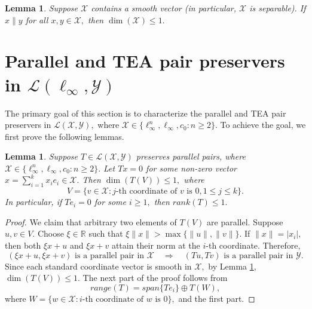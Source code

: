 \documentclass{amsart}
\newtheorem{lemma}[theorem]{Lemma}
\theoremstyle{definition}
\theoremstyle{remark}
\numberwithin{equation}{section}
\begin{document}
\begin{lemma}\label{lem-pdim}\cite[Lemma 2.3]{M} 
	Suppose $\mathcal{X}$ contains a smooth vector (in particular, $\mathcal{X}$ is separable). If $x\parallel y$ for all $x,y\in \mathcal{X},$ then $\dim(\mathcal{X})\leq 1.$	
\end{lemma}

\section{Parallel and TEA pair preservers in $\mathcal{L}(\ell_\infty,\mathcal{Y})$ }\label{sec-infinity}
The primary goal of this section is to characterize the parallel and TEA pair preservers in $\mathcal{L}(\mathcal{X},\mathcal{Y}),$  where  $\mathcal{X}\in \{\ell_\infty^n,\ell_\infty,c_0:n\geq 2\}.$  To achieve the goal, we first prove the following lemmas.


\begin{lemma}\label{lem-r1}
	Suppose $T\in \mathcal{L}(\mathcal{X},\mathcal{Y})$  preserves parallel pairs, where  $\mathcal{X}\in \{\ell_\infty^n,\ell_\infty,c_0:n\geq 2\}.$  Let $Tx=0$ for some non-zero vector $x=\sum_{i=1}^kx_ie_i\in \mathcal{X}.$ Then $\dim(T(V))\leq 1,$ where $$V=\{v\in \mathcal{X}:j\text{-th coordinate of } v \text{ is }0, 1\leq j\leq k\}.$$
	In particular, if $Te_i=0$ for some $i\geq 1,$ then $rank(T)\leq 1.$
\end{lemma}
\begin{proof}
 We claim that arbitrary two elements of $T(V)$ are parallel. Suppose $u,v\in V.$ Choose $\xi\in \mathbb{R}$ such that  $\xi \|x\|>\max\{\|u\|,\|v\|\}.$ If $\|x\|=|x_i|,$ then both $\xi x+u$ and $\xi  x+v$ attain their norm at the $i$-th coordinate. Therefore, 
\[(\xi x+u,\xi x+v) \text{ is a parallel pair in }\mathcal{X}\quad \Rightarrow \quad (Tu,Tv) \text{ is a parallel pair in }\mathcal{Y}.\]
Since each standard coordinate vector is smooth in $\mathcal{X},$ by Lemma \ref{lem-pdim}, $\dim(T(V))\leq 1.$ 
The next part of the proof follows from  $$range(T)=span\{Te_i\}\oplus T(W),$$ where $W=\{w\in \mathcal{X}:i\text{-th coordinate of } w \text{ is }0\},$ and the first part.
\end{proof}
\end{document}
